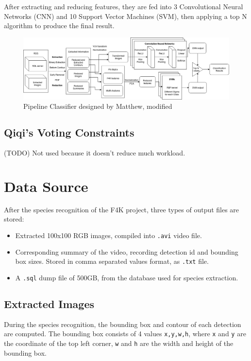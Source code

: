 \documentclass[bsc,logo,twoside,fullspacing,parskip]{infthesis}
\begin{document}
After extracting and reducing features, they are fed into 3 Convolutional Neural Networks (CNN) and 10 Support Vector Machines (SVM), then applying a top N algorithm to produce the final result. 

\begin{figure}[!t]
    \centering
    \includegraphics[scale=0.34]{graph/Pipeline_Classifier.png}
    \caption{Pipeline Classifier designed by Matthew, modified}
    \label{fig:pipeline}
\end{figure}

\section{Qiqi's Voting Constraints}

(TODO) Not used because it doesn't reduce much workload.


\chapter{Data Source}
\label{sec:datasource}

After the species recognition of the F4K project, three types of output files are stored:
\begin{itemize}
\item
Extracted 100x100 RGB images, compiled into {\tt .avi} video file.
\item
Corresponding summary of the video, recording detection id and bounding box sizes. Stored in comma separated values format, as {\tt .txt} file.
\item
A {\tt .sql} dump file of 500GB, from the database used for species extraction.
\end{itemize}

\section{Extracted Images}
\label{sec:summaries}

During the species recognition, the bounding box and contour of each detection are computed.
The bounding box consists of 4 values {\tt x,y,w,h}, where {\tt x} and {\tt y} are the coordinate of the top left corner, {\tt w} and {\tt h} are the width and height of the bounding box. 
\end{document}
